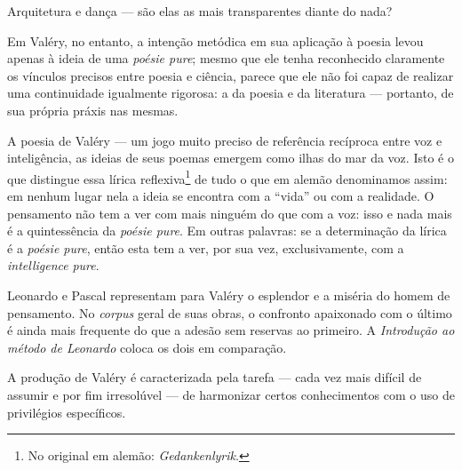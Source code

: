 Arquitetura e dança --- são elas as mais transparentes diante do nada?

Em Valéry, no entanto, a intenção metódica em sua aplicação à poesia
levou apenas à ideia de uma \emph{poésie pure}; mesmo que ele tenha
reconhecido claramente os vínculos precisos entre poesia e ciência,
parece que ele não foi capaz de realizar uma continuidade igualmente
rigorosa: a da poesia e da literatura --- portanto, de sua própria práxis
nas mesmas.

A poesia de Valéry --- um jogo muito preciso de referência recíproca entre
voz e inteligência, as ideias de seus poemas emergem como ilhas do mar
da voz. Isto é o que distingue essa lírica reflexiva\footnote{No
  original em alemão: \emph{Gedankenlyrik}. \versal{[N. T.]}} de tudo o que em alemão denominamos
assim: em nenhum lugar nela a ideia se encontra com a ``vida'' ou com a
realidade. O pensamento não tem a ver com mais ninguém do que com a voz:
isso e nada mais é a quintessência da \emph{poésie pure}. Em outras
palavras: se a determinação da lírica é a \emph{poésie pure}, então esta
tem a ver, por sua vez, exclusivamente, com a \emph{intelligence}
\emph{pure}.

Leonardo e Pascal representam para Valéry o esplendor e a miséria do
homem de pensamento. No \emph{corpus} geral de suas obras, o confronto
apaixonado com o último é ainda mais frequente do que a adesão sem
reservas ao primeiro. A \emph{Introdução ao método de Leonardo} coloca os
dois em comparação.

A produção de Valéry é caracterizada pela tarefa --- cada vez mais
difícil de assumir e por fim irresolúvel --- de harmonizar certos
conhecimentos com o uso de privilégios específicos.
